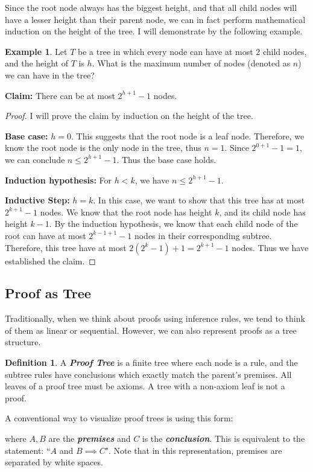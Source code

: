 \documentclass[a4paper,11pt]{article}
\theoremstyle{definition}
\newtheorem{definition}{Definition}[section]
\theoremstyle{example}
\newtheorem*{example}{Example}
\theoremstyle{lemma}
\begin{document}
Since the root node always has the biggest height, and that all child nodes will have a lesser height than their parent node, we can in fact perform mathematical induction on the height of the tree. I will demonstrate by the following example.

\begin{example}
Let $T$ be a tree in which every node can have at most $2$ child nodes, and the height of $T$ is $h$. What is the maximum number of nodes (denoted as $n$) we can have in the tree?
\end{example}
\noindent\textbf{Claim: }There can be at most $2^{h+1} - 1$ nodes.
\begin{proof}
I will prove the claim by induction on the height of the tree.

\textbf{Base case: }$h = 0$. This suggests that the root node is a leaf node. Therefore, we know the root node is the only node in the tree, thus $n = 1$. Since $2^{0+1} - 1 = 1$, we can conclude $n \leq 2^{h+1} - 1$. Thus the base case holds.

\textbf{Induction hypothesis: }For $h < k$, we have $n \leq 2^{h+1} - 1$.

\textbf{Inductive Step: }$h = k$. In this case, we want to show that this tree has at most $2^{k+1} - 1$ nodes. We know that the root node has height $k$, and its child node has height $k-1$. By the induction hypothesis, we know that each child node of the root can have at most $2^{k-1+1}-1$ nodes in their corresponding subtree. Therefore, this tree have at most $2(2^{k}-1) + 1 = 2^{k+1} - 1$ nodes. Thus we have established the claim.

\end{proof}

\subsection{Proof as Tree}
Traditionally, when we think about proofs using inference rules, we tend to think of them as linear or sequential. However, we can also represent proofs as a tree structure.

\begin{definition}
A \textit{\textbf{Proof Tree}} is a finite tree where each node is a rule, and the subtree rules have conclusions which exactly match the parent's premises. All leaves of a proof tree must be axioms. A tree with a non-axiom leaf is not a proof.
\end{definition}

A conventional way to visualize proof trees is using this form:
\begin{mathpar}
\end{mathpar}
where $A, B$ are the \textit{\textbf{premises}} and $C$ is the \textit{\textbf{conclusion}}. This is equivalent to the statement: ``$A$ and $B \implies C$". Note that in this representation, premises are separated by white spaces. 
\end{document}
